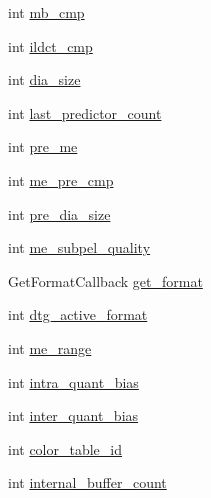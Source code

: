 \begin{DoxyCompactItemize}
\item 
int \hyperlink{struct_tao_1_1_f_fmpeg_1_1_f_fmpeg_1_1_a_v_codec_context_abda1de282e80667e4582ee3b100d40e3}{mb\_\-cmp}
\item 
int \hyperlink{struct_tao_1_1_f_fmpeg_1_1_f_fmpeg_1_1_a_v_codec_context_aa370704b3271e840ba642cd2121670d5}{ildct\_\-cmp}
\item 
int \hyperlink{struct_tao_1_1_f_fmpeg_1_1_f_fmpeg_1_1_a_v_codec_context_ac1e7fe9512c33818fadd9d52e801f224}{dia\_\-size}
\item 
int \hyperlink{struct_tao_1_1_f_fmpeg_1_1_f_fmpeg_1_1_a_v_codec_context_a750d6fbf14f517080d5ce832aac32177}{last\_\-predictor\_\-count}
\item 
int \hyperlink{struct_tao_1_1_f_fmpeg_1_1_f_fmpeg_1_1_a_v_codec_context_a3893cd1161ba3a77788203ebeee94e12}{pre\_\-me}
\item 
int \hyperlink{struct_tao_1_1_f_fmpeg_1_1_f_fmpeg_1_1_a_v_codec_context_afa8de5c689ce15f46869b701fab12db9}{me\_\-pre\_\-cmp}
\item 
int \hyperlink{struct_tao_1_1_f_fmpeg_1_1_f_fmpeg_1_1_a_v_codec_context_a19b5a2c34c4965c984a46922e046e80a}{pre\_\-dia\_\-size}
\item 
int \hyperlink{struct_tao_1_1_f_fmpeg_1_1_f_fmpeg_1_1_a_v_codec_context_a5478fd89aa95295579576f87b69878b5}{me\_\-subpel\_\-quality}
\item 
GetFormatCallback \hyperlink{struct_tao_1_1_f_fmpeg_1_1_f_fmpeg_1_1_a_v_codec_context_aa1e2ce4aee944643c21c6d9ebd11737c}{get\_\-format}
\item 
int \hyperlink{struct_tao_1_1_f_fmpeg_1_1_f_fmpeg_1_1_a_v_codec_context_ad73eda5c004c023376efb910b4b82102}{dtg\_\-active\_\-format}
\item 
int \hyperlink{struct_tao_1_1_f_fmpeg_1_1_f_fmpeg_1_1_a_v_codec_context_abbc0e7f348a79c49d840a744284e855b}{me\_\-range}
\item 
int \hyperlink{struct_tao_1_1_f_fmpeg_1_1_f_fmpeg_1_1_a_v_codec_context_a41d8ee1cf17a655160bcbaf87b7d046b}{intra\_\-quant\_\-bias}
\item 
int \hyperlink{struct_tao_1_1_f_fmpeg_1_1_f_fmpeg_1_1_a_v_codec_context_a840cd4c3990fb6c0d56379a55dd246c7}{inter\_\-quant\_\-bias}
\item 
int \hyperlink{struct_tao_1_1_f_fmpeg_1_1_f_fmpeg_1_1_a_v_codec_context_adb27ffb227ada0a0008687c823164fcb}{color\_\-table\_\-id}
\item 
int \hyperlink{struct_tao_1_1_f_fmpeg_1_1_f_fmpeg_1_1_a_v_codec_context_a80a086433847e01a319aa7d648830538}{internal\_\-buffer\_\-count}

\end{DoxyCompactItemize}
